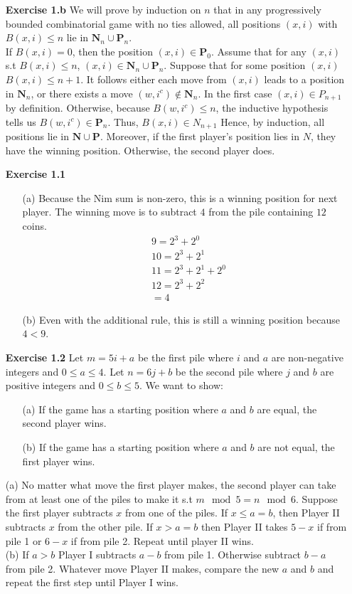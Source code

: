 \documentclass[10pt]{article}
\begin{document}
\begin{itemize}
    \item [\textbf{Exercise 1.b}] We will prove by induction on $n$ that in any progressively bounded combinatorial game with no ties allowed, all positions $(x,i)$ with $B(x,i)\le n$ lie in $\mathbf{N}_n\cup \mathbf{P}_n$.\\
    If $B(x,i)=0$, then the position $(x,i)\in \mathbf{P}_0$. Assume that for any $(x,i)$ s.t $B(x,i)\le n$, $(x,i)\in \mathbf{N}_n\cup \mathbf{P}_n$. Suppose that for some position $(x,i)$ $B(x,i)\le n+1$. It follows either each move from $(x,i)$ leads to a position in $\mathbf{N}_n$, or there exists a move $(w,i^c)\notin \mathbf{N}_n$. In the first case $(x,i)\in P_{n+1}$ by definition. Otherwise, because $B(w,i^c)\le n$, the inductive hypothesis tells us $B(w,i^c)\in \mathbf{P}_n$. Thus, $B(x,i)\in N_{n+1}$ Hence, by induction, all positions lie in $\mathbf{N}\cup \mathbf{P}$. Moreover, if the first player's position lies in $N$, they have the winning position. Otherwise, the second player does.  
\item [\textbf{Exercise 1.1}]
\begin{itemize}
    \item [(a)] Because the Nim sum is non-zero, this is a winning position for next player. The winning move is to subtract $4$ from the pile containing $12$ coins.
    \begin{align*}
        & 9=2^3+2^0\\
        & 10=2^3+2^1\\
        & 11=2^3+2^1+2^0\\
        & 12=2^3+2^2\\
        & =4
    \end{align*}
    \item [(b)] Even with the additional rule, this is still a winning position because $4<9$.
\end{itemize}
\item [\textbf{Exercise 1.2}] Let $m=5i+a$ be the first pile where $i$ and $a$ are non-negative integers and $0\le a\le 4$. Let $n=6j+b$ be the second pile where $j$ and $b$ are positive integers and $0\le b\le 5$. We want to show:
\begin{itemize}
    \item [(a)] If the game has a starting position where $a$ and $b$ are equal, the second player wins. 
    \item [(b)] If the game has a starting position where $a$ and $b$ are not equal, the first player wins.
\end{itemize}
(a) No matter what move the first player makes, the second player can take from at least one of the piles to make it s.t $m\mod5=n\mod6$. Suppose the first player subtracts $x$ from one of the piles. If $x\le a=b$, then Player II subtracts $x$ from the other pile. If $x>a=b$ then Player II takes $5-x$ if from pile 1 or $6-x$ if from pile 2. Repeat until player II wins.\\ 
(b) If $a>b$ Player I subtracts $a-b$ from pile 1. Otherwise subtract $b-a$ from pile 2. Whatever move Player II makes, compare the new $a$ and $b$ and repeat the first step until Player I wins.
 

\end{itemize}
\end{document}
